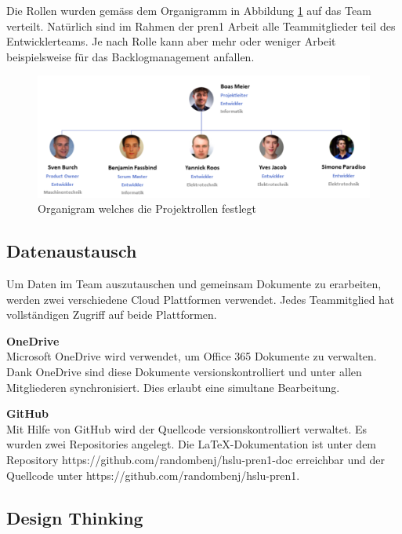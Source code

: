 \newpage

Die Rollen wurden gemäss dem Organigramm in Abbildung \ref{fig:organigramm} auf das Team verteilt. Natürlich sind im Rahmen der \acrshort{pren1} Arbeit alle Teammitglieder teil des Entwicklerteams.
Je nach Rolle kann aber mehr oder weniger Arbeit beispielsweise für das Backlogmanagement anfallen.

\begin{figure}[H]
  \includegraphics[width=1.0\textwidth]{img/organigram}
  \centering
  \caption{Organigram welches die Projektrollen festlegt}
  \label{fig:organigramm}
\end{figure}

\subsection{Datenaustausch}
Um Daten im Team auszutauschen und gemeinsam Dokumente zu erarbeiten, werden zwei verschiedene Cloud Plattformen verwendet. Jedes Teammitglied hat vollständigen Zugriff auf beide Plattformen.

\textbf{OneDrive}\\
Microsoft OneDrive wird verwendet, um Office 365 Dokumente zu verwalten. Dank OneDrive sind diese Dokumente versionskontrolliert und unter allen Mitgliederen synchronisiert. Dies erlaubt eine simultane Bearbeitung.

\textbf{GitHub}\\
Mit Hilfe von GitHub wird der Quellcode versionskontrolliert verwaltet. Es wurden zwei Repositories angelegt. Die \LaTeX-Dokumentation ist unter dem Repository https://github.com/randombenj/hslu-pren1-doc erreichbar und der Quellcode unter https://github.com/randombenj/hslu-pren1.

\newpage

\subsection{Design Thinking}
\label{sec:design-thinking}


